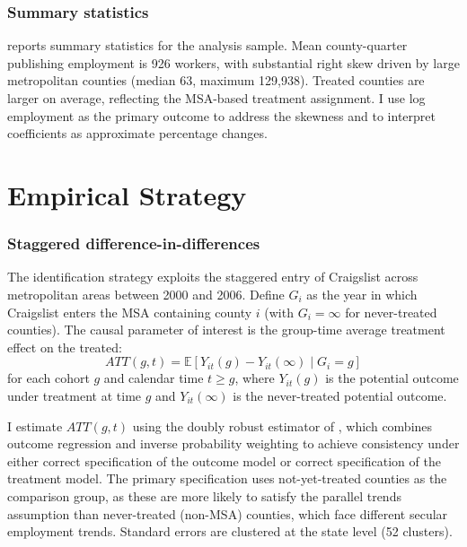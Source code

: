 \documentclass[12pt]{article}
\newcommand{\E}{\mathbb{E}}
\begin{document}
\subsubsection*{Summary statistics}  reports summary statistics for the analysis sample. Mean county-quarter publishing employment is 926 workers, with substantial right skew driven by large metropolitan counties (median 63, maximum 129,938). Treated counties are larger on average, reflecting the MSA-based treatment assignment. I use log employment as the primary outcome to address the skewness and to interpret coefficients as approximate percentage changes.




\section{Empirical Strategy}

\subsubsection*{Staggered difference-in-differences} The identification strategy exploits the staggered entry of Craigslist across metropolitan areas between 2000 and 2006. Define $G_i$ as the year in which Craigslist enters the MSA containing county $i$ (with $G_i = \infty$ for never-treated counties). The causal parameter of interest is the group-time average treatment effect on the treated:
\begin{equation}
ATT(g,t) = \E[Y_{it}(g) - Y_{it}(\infty) \mid G_i = g]
\end{equation}
for each cohort $g$ and calendar time $t \geq g$, where $Y_{it}(g)$ is the potential outcome under treatment at time $g$ and $Y_{it}(\infty)$ is the never-treated potential outcome.

I estimate $ATT(g,t)$ using the doubly robust estimator of \citet{callaway_santanna_2021}, which combines outcome regression and inverse probability weighting to achieve consistency under either correct specification of the outcome model or correct specification of the treatment model. The primary specification uses not-yet-treated counties as the comparison group, as these are more likely to satisfy the parallel trends assumption than never-treated (non-MSA) counties, which face different secular employment trends. Standard errors are clustered at the state level (52 clusters).
\end{document}
